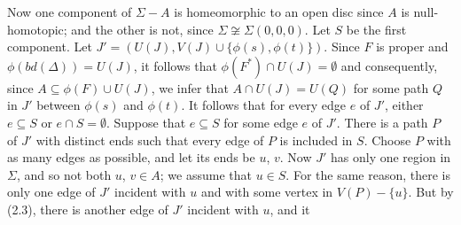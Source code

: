 Now one component of $\Sigma - A$ is homeomorphic to an open disc since $A$ is null-homotopic; and the other is not, since $\Sigma \not\cong \Sigma(0, 0, 0)$. Let $S$ be the first component. Let $J' = (U(J), V(J) \cup \{\phi(s), \phi(t)\})$. Since $F$ is proper and $\phi(bd(\Delta)) = U(J)$, it follows that $\phi(F^*) \cap U(J) = \emptyset$ and consequently, since $A \subseteq \phi(F) \cup U(J)$, we infer that $A \cap U(J) = U(Q)$ for some path $Q$ in $J'$ between $\phi(s)$ and $\phi(t)$. It follows that for every edge $e$ of $J'$, either $e \subseteq S$ or $e \cap S = \emptyset$. Suppose that $e \subseteq S$ for some edge $e$ of $J'$. There is a path $P$ of $J'$ with distinct ends such that every edge of $P$ is included in $S$. Choose $P$ with as many edges as possible, and let its ends be $u$, $v$. Now $J'$ has only one region in $\Sigma$, and so not both $u$, $v \in A$; we assume that $u \in S$. For the same reason, there is only one edge of $J'$ incident with $u$ and with some vertex in $V(P) - \{u\}$. But by (2.3), there is another edge of $J'$ incident with $u$, and it
